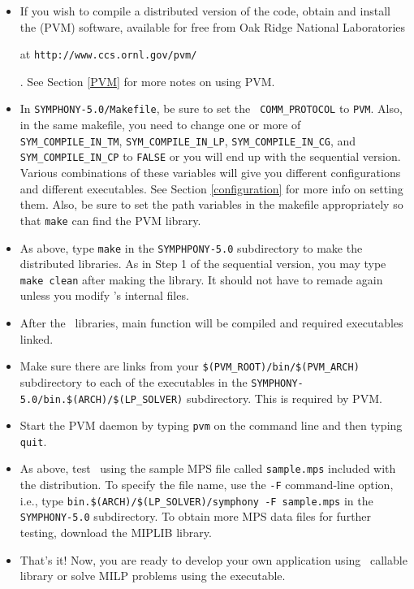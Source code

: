 \begin{itemize}
        \item If you wish to compile a distributed version of the code, obtain
and install the {\em {}} (PVM) software, available for free
from Oak Ridge National Laboratories
\begin{latexonly}
        at {\tt http://www.ccs.ornl.gov/pvm/}
\end{latexonly}. 
        See Section \ref{PVM} for more notes on using PVM.
        
        \item In \texttt{SYMPHONY-5.0/Makefile}, be sure to set the {\tt
        COMM\_PROTOCOL} to {\tt PVM}. Also, in
        the same makefile, you need to change one or more of {\tt
        SYM\_COMPILE\_IN\_TM}, {\tt SYM\_COMPILE\_IN\_LP}, 
	{\tt SYM\_COMPILE\_IN\_CG}, and
        {\tt SYM\_COMPILE\_IN\_CP} to {\tt FALSE} or you will end up with the
        sequential version. Various combinations of these variables will give
        you different configurations and different executables. See Section
        \ref{configuration} for more info on setting them. Also, be sure to
        set the path variables in the makefile appropriately so that 
	\texttt{make} can find the PVM library.

        \item As above, type {\tt  make} in the \texttt{SYMPHPONY-5.0} 
	subdirectory to
        make the distributed libraries. As in Step 1 of the sequential
        version, you may type {\tt  make clean} after making the
        library. It should not have to remade again unless you modify
        \BB's internal files.

        \item After the \BB\ libraries, main function will be compiled and
        required executables linked.

        \item Make sure there are links from your
        \texttt{\$(PVM\_ROOT)/bin/\$(PVM\_ARCH)} subdirectory to each of the
        executables in the
        \texttt{SYMPHONY-5.0/bin.\$(ARCH)/\$(LP\_SOLVER)} subdirectory. 
	This is required by PVM.

        \item Start the PVM daemon by typing {\tt  pvm} on the command line
        and then typing {\tt  quit}.

        \item As above, test \BB\ using the sample MPS file called
        \texttt{sample.mps} included with the distribution. To specify the
        file name, use the \texttt{-F} command-line option, i.e., type
        \texttt{bin.\$(ARCH)/\$(LP\_SOLVER)/symphony -F sample.mps} in the
        \texttt{SYMPHONY-5.0} subdirectory. To obtain more MPS data files
        for further testing, download the MIPLIB library.

        \item That's it! Now, you are ready to develop your own application 
	using \BB\ callable library or solve MILP problems using the 
	executable.

\end{itemize}

